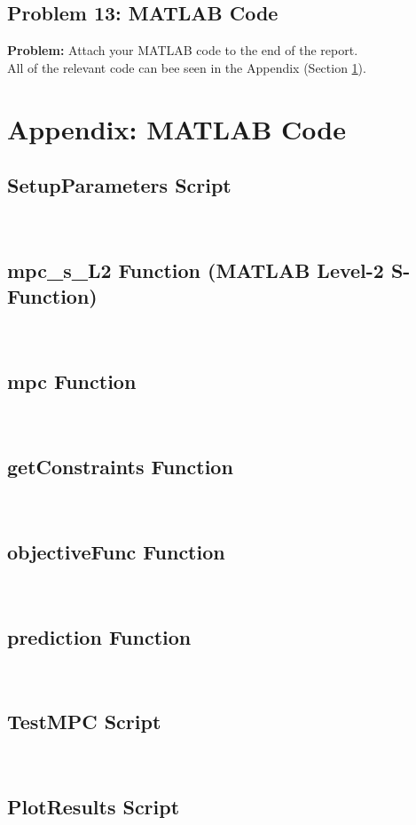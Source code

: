 \documentclass[12pt]{article}
\begin{document}
\subsection{Problem 13: MATLAB Code}

\textbf{Problem:} Attach your MATLAB code to the end of the report. \\

All of the relevant code can bee seen in the Appendix (Section \ref{code:Appendix}).




\section{Appendix: MATLAB Code}
\label{code:Appendix}

\subsection{SetupParameters Script}
\label{code:Setup}

\,

\subsection{mpc\_s\_L2 Function (MATLAB Level-2 S-Function)}
\label{code:mpcL2}

\,

\subsection{mpc Function}
\label{code:mpc}

\,

\subsection{getConstraints Function}
\label{code:getConstraints}

\,

\subsection{objectiveFunc Function}
\label{code:objectiveFunc}

\,

\subsection{prediction Function}
\label{code:prediction}

\,

\subsection{TestMPC Script}
\label{code:TestMPC}

\,

\subsection{PlotResults Script}
\label{code:PlotResults}

\,
\end{document}
